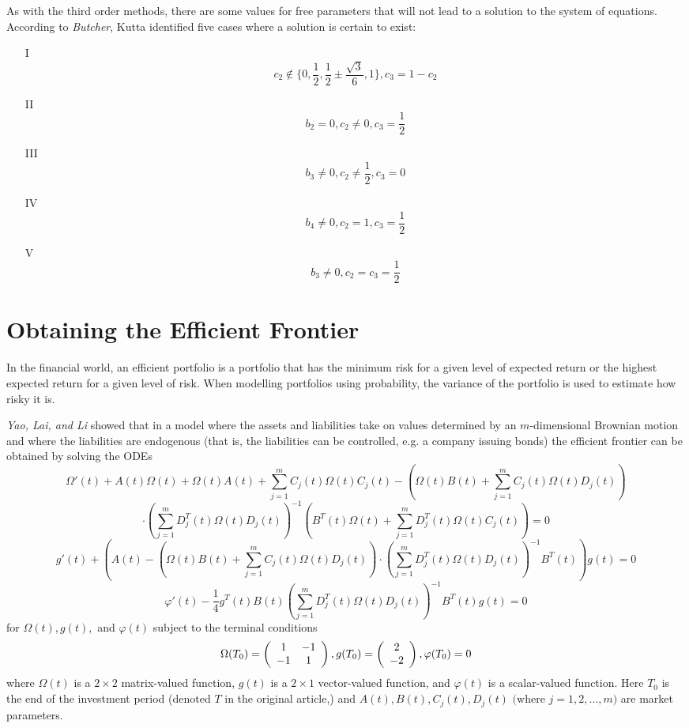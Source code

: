 \documentclass[12pt]{amsart}
\theoremstyle{definition}
\begin{document}
As with the third order methods, there are some values for free parameters that will not lead to a
solution to the system of equations. According to \textit{Butcher}, Kutta identified five cases where a solution
is certain to exist:
\begin{itemize}
\item[I]$$c_2 \notin \{ 0, \frac12, \frac12 \pm \frac{\sqrt3}{6}, 1\}, c_3 = 1 - c_2$$
\item[II] $$b_2 = 0, c_2 \ne 0, c_3 = \frac12$$
\item[III] $$b_3 \ne 0, c_2 \ne \frac12, c_3 = 0$$
\item[IV] $$b_4 \ne 0, c_2 = 1, c_3 = \frac12$$
\item[V] $$b_3 \ne 0, c_2 = c_3 = \frac12$$
\end{itemize}

\section{Obtaining the Efficient Frontier}
In the financial world, an efficient portfolio is a portfolio that has the minimum risk for a given level
of expected return or the highest expected return for a given level of risk. When modelling portfolios
using probability, the variance of the portfolio is used to estimate how risky it is.

\textit{Yao, Lai, and Li} showed that in a model where the assets and liabilities
take on values determined by an $m$-dimensional Brownian motion and where the liabilities are endogenous
(that is, the liabilities can be controlled, e.g. a company issuing bonds)
the efficient frontier can be obtained by solving the ODEs
$$\Omega'(t) + A(t)\Omega(t) + \Omega(t)A(t) + \sum_{j=1}^m{C_j(t)\Omega(t)C_j(t)} - 
\left(\Omega(t)B(t) + \sum_{j=1}^m{C_j(t)\Omega(t)D_j(t)}\right)$$
$$\cdot \left( \sum_{j=1}^m{D_j^T(t)\Omega(t)D_j(t)} \right)^{-1}
\left( B^T(t)\Omega(t) + \sum_{j=1}^m{D_j^T(t)\Omega(t)C_j(t)} \right) = 0$$ \newline
$$g'(t) + \left( A(t) - \left( \Omega(t)B(t) + \sum_{j=1}^m{C_j(t)\Omega(t)D_j(t)} \right) 
\cdot \left( \sum_{j=1}^m{D_j^T(t)\Omega(t)D_j(t)} \right)^{-1} B^T(t)\right)g(t) = 0$$ \newline
$$\varphi'(t) - \frac{1}{4}g^T(t)B(t)\left( \sum_{j=1}^m{D_j^T(t)\Omega(t)D_j(t)} \right)^{-1} B^T(t)g(t) = 0$$ \newline
for $\Omega(t), g(t),$ and $\varphi(t)$ subject to the terminal conditions
$$\Omega(T_0) = \left( \begin{array}{c c} 
1 & -1 \\
-1 & 1
\end{array} \right), 
g(T_0) =  \left( \begin{array}{c} 
2 \\
-2 
\end{array} \right),
\varphi(T_0) = 0$$
where $\Omega(t)$ is a $2 \times 2$ matrix-valued function, $g(t)$ is a $2 \times 1$ vector-valued function,
and $\varphi(t)$ is a scalar-valued function. Here $T_0$ is the end of the investment period (denoted $T$
in the original article,) and $A(t), B(t), C_j(t), D_j(t) \mbox{ (where } j = 1,2, \dots, m)$ are market parameters.
\end{document}
